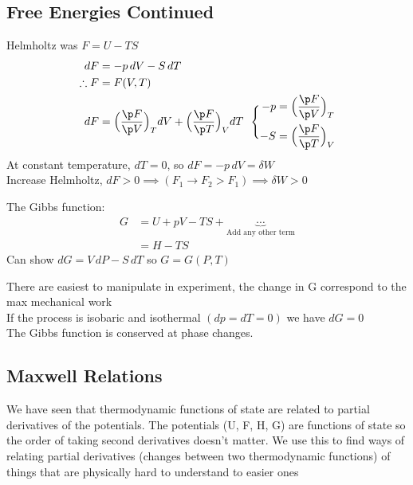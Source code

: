 \documentclass[a4paper, 11pt, normalem]{report}
\begin{document}
\chapter{}
\section{Free Energies Continued}
Helmholtz was $F = U - TS$
\begin{align*}
    dF &= -p\,dV - S\,dT \\
    \therefore F &= F(V,T) \\
    dF &= \Big(\frac{\p F}{\p V}\Big)_T dV + \Big(\frac{\p F}{\p T}\Big)_V dT
    ~~\Bigg\{ \begin{aligned}
                -p &= \Big(\frac{\p F}{\p V}\Big)_T \\
                -S &= \Big(\frac{\p F}{\p T}\Big)_V
            \end{aligned}
\end{align*}
At constant temperature, $dT = 0$, so $dF = -p\,dV = \delta W$ \\
Increase Helmholtz, $dF > 0 \implies (F_1 \to F_2 > F_1) \implies \delta W > 0$

The Gibbs function:
\begin{align*}
    G &= U + pV - TS + \underbrace{\cdots}_{\text{Add any other term}} \\
    &= H - TS
\end{align*}
Can show $dG = V\,dP - S\,dT$ so $G = G(P, T)$

There are easiest to manipulate in experiment, the change in G correspond to the max mechanical work \\
If the process is isobaric and isothermal $(dp = dT = 0)$ we have $dG = 0$ \\
The Gibbs function is conserved at phase changes.

\section{Maxwell Relations}
We have seen that thermodynamic functions of state are related to partial derivatives of the potentials. The potentials (U, F, H, G) are functions of state so the order of taking second derivatives doesn't matter. We use this to find ways of relating partial derivatives (changes between two thermodynamic functions) of things that are physically hard to understand to easier ones
\end{document}
